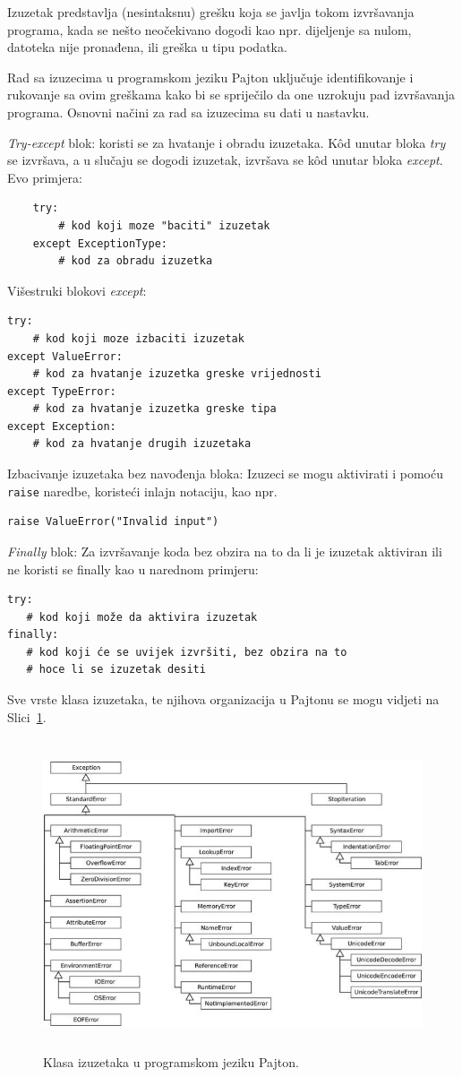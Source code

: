 Izuzetak predstavlja (nesintaksnu) grešku koja se javlja tokom izvršavanja programa, kada se nešto neočekivano dogodi kao npr. dijeljenje sa nulom, datoteka nije pronađena, ili greška u tipu podatka.

Rad sa izuzecima u programskom jeziku Pajton uključuje identifikovanje i rukovanje sa ovim greškama kako bi se spriječilo da one uzrokuju pad izvršavanja programa. Osnovni  načini za rad sa izuzecima su dati u nastavku.

\textit{Try-except }blok: koristi se za hvatanje i obradu izuzetaka. Kôd unutar bloka \textit{try} se izvršava, a u slučaju se dogodi izuzetak, izvršava se k\^od unutar bloka \textit{except}. Evo primjera:
\begin{verbatim}
	try:
	    # kod koji moze "baciti" izuzetak
	except ExceptionType:
	    # kod za obradu izuzetka
\end{verbatim}
Višestruki blokovi \textit{except}:  
\begin{verbatim}
try:
    # kod koji moze izbaciti izuzetak
except ValueError:
    # kod za hvatanje izuzetka greske vrijednosti
except TypeError:
    # kod za hvatanje izuzetka greske tipa
except Exception:
    # kod za hvatanje drugih izuzetaka
\end{verbatim}
Izbacivanje izuzetaka bez   navođenja bloka: Izuzeci se mogu aktivirati i pomoću   \texttt{raise} naredbe, koristeći inlajn notaciju, kao npr.
\begin{verbatim}
raise ValueError("Invalid input")
\end{verbatim}
\textit{Finally} blok: Za izvršavanje koda bez obzira na to da li je izuzetak aktiviran ili ne koristi se finally kao u narednom primjeru:
\begin{verbatim}
try:
   # kod koji može da aktivira izuzetak
finally:
   # kod koji će se uvijek izvršiti, bez obzira na to
   # hoce li se izuzetak desiti
\end{verbatim}

Sve vrste klasa izuzetaka, te njihova organizacija u Pajtonu se mogu vidjeti na Slici~\ref{fig: exceptions}.  
\begin{figure}[H]
	\centering
	\includegraphics[width=400pt,height=260pt]{slike/419627_1_En_2_Fig4_HTML.jpg}
	\caption{Klasa izuzetaka u programskom jeziku Pajton.}
	\label{fig: exceptions}
\end{figure}

